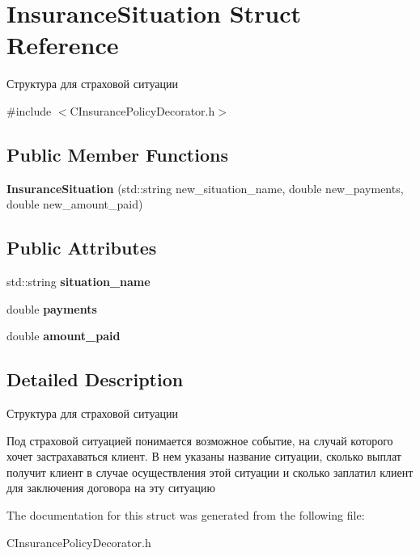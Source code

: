 \hypertarget{structInsuranceSituation}{}\section{Insurance\+Situation Struct Reference}
\label{structInsuranceSituation}


Структура для страховой ситуации  




{\ttfamily \#include $<$C\+Insurance\+Policy\+Decorator.\+h$>$}

\subsection*{Public Member Functions}
\begin{DoxyCompactItemize}
\item 
{\bfseries Insurance\+Situation} (std\+::string new\+\_\+situation\+\_\+name, double new\+\_\+payments, double new\+\_\+amount\+\_\+paid)\hypertarget{structInsuranceSituation_a5abc955b68c499c135ecb8af3c560110}{}\label{structInsuranceSituation_a5abc955b68c499c135ecb8af3c560110}

\end{DoxyCompactItemize}
\subsection*{Public Attributes}
\begin{DoxyCompactItemize}
\item 
std\+::string {\bfseries situation\+\_\+name}\hypertarget{structInsuranceSituation_ae39f17f3404cf9f155b9e92fdf90270f}{}\label{structInsuranceSituation_ae39f17f3404cf9f155b9e92fdf90270f}

\item 
double {\bfseries payments}\hypertarget{structInsuranceSituation_a3f2a55ec781bc15331c4d8886be2df8c}{}\label{structInsuranceSituation_a3f2a55ec781bc15331c4d8886be2df8c}

\item 
double {\bfseries amount\+\_\+paid}\hypertarget{structInsuranceSituation_a5d70de958639a10a77f41531db367c4f}{}\label{structInsuranceSituation_a5d70de958639a10a77f41531db367c4f}

\end{DoxyCompactItemize}


\subsection{Detailed Description}
Структура для страховой ситуации 

Под страховой ситуацией понимается возможное событие, на случай которого хочет застрахаваться клиент. В нем указаны название ситуации, сколько выплат получит клиент в случае осуществления этой ситуации и сколько заплатил клиент для заключения договора на эту ситуацию 

The documentation for this struct was generated from the following file\+:\begin{DoxyCompactItemize}
\item 
C\+Insurance\+Policy\+Decorator.\+h\end{DoxyCompactItemize}

